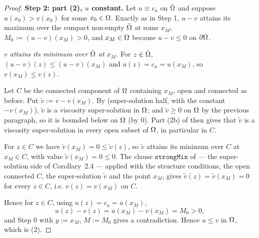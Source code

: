 \begin{proof}
\medskip\noindent\textbf{Step 2: part (2), $u$ constant.} Let $u\equiv c_u$ on $\bar{\Omega}$ and
suppose $u(x_0)>v(x_0)$ for some $x_0\in\Omega$. Exactly as in Step 1, $u-v$ attains its maximum
over the compact non-empty $\bar{\Omega}$ at some $x_M$, $M_0:=(u-v)(x_M)>0$, and $x_M\in\Omega$
because $u-v\le0$ on $\partial\Omega$.

\emph{$v$ attains its minimum over $\bar{\Omega}$ at $x_M$.} For $z\in\bar{\Omega}$,
$(u-v)(z)\le(u-v)(x_M)$ and $u(z)=c_u=u(x_M)$, so $v(x_M)\le v(z)$.

Let $C$ be the connected component of $\Omega$ containing $x_M$, open and connected as before.
Put $\tilde v:=v-v(x_M)$. By  (super-solution half, with the
constant $-v(x_M)$), $\tilde v$ is a viscosity super-solution in $\Omega$; and $\tilde v\ge0$ on
$\Omega$ by the previous paragraph, so it is bounded below on $\Omega$ (by $0$). Part (2b) of
 then gives that $\tilde v$ is a viscosity super-solution in
every open subset of $\Omega$, in particular in $C$.

For $z\in C$ we have $\tilde v(x_M)=0\le\tilde v(z)$, so $\tilde v$ attains its minimum over
$C$ at $x_M\in C$, with value $\tilde v(x_M)=0\le0$. The clause $\mathtt{strongMin}$ of
 --- the super-solution side of Corollary~2.4 --- applied with the structure
conditions, the open connected $C$, the super-solution $\tilde v$ and the point $x_M$, gives
$\tilde v(z)=\tilde v(x_M)=0$ for every $z\in C$, i.e. $v(z)=v(x_M)$ on $C$.

Hence for $z\in C$, using $u(z)=c_u=u(x_M)$,
\[
 u(z)-v(z)=u(x_M)-v(x_M)=M_0>0 ,
\]
and Step 0 with $y:=x_M$, $M:=M_0$ gives a contradiction. Hence $u\le v$ in $\Omega$, which is
(2).
\end{proof}
